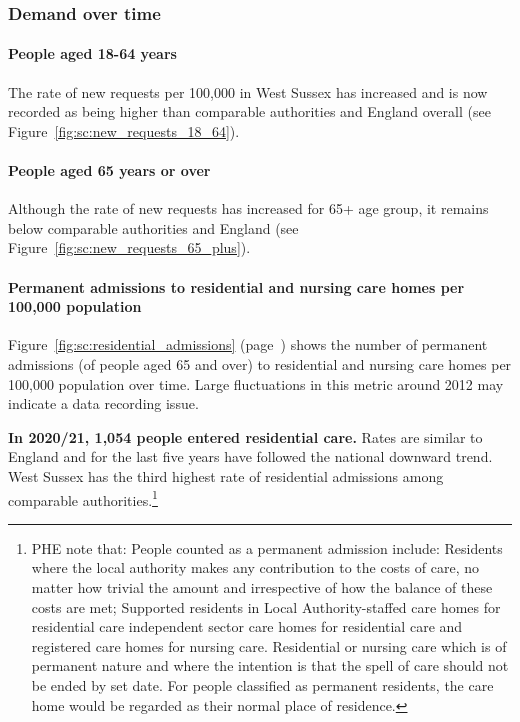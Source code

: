 \subsubsection{Demand over time}
\paragraph{People aged 18-64 years} The rate of new requests per 100,000 in West Sussex has increased and is now recorded as being higher than comparable authorities and England overall (see Figure~\ref{fig:sc:new_requests_18_64}).

\paragraph{People aged 65 years or over} Although the rate of new requests has increased for 65+ age group, it remains below comparable authorities and England (see Figure~\ref{fig:sc:new_requests_65_plus}).

\paragraph{Permanent admissions to residential and nursing care homes per 100,000 population} Figure~\ref{fig:sc:residential_admissions} (page~\pageref{fig:sc:residential_admissions}) shows the number of permanent admissions (of people aged 65 and over) to residential and nursing care homes per 100,000 population over time. Large fluctuations in this metric around 2012 may indicate a data recording issue.

{\bfseries In 2020/21, 1,054 people entered residential care.} Rates are similar to England and for the last five years have followed the national downward trend. West Sussex has the third highest rate of residential admissions among comparable authorities.\footnote{PHE note that: People counted as a permanent admission include: Residents where the local authority makes any contribution to the costs of care, no matter how trivial the amount and irrespective of how the balance of these costs are met; Supported residents in Local Authority-staffed care homes for residential care independent sector care homes for residential care and registered care homes for nursing care. Residential or nursing care which is of permanent nature and where the intention is that the spell of care should not be ended by set date. For people classified as permanent residents, the care home would be regarded as their normal place of residence.}

